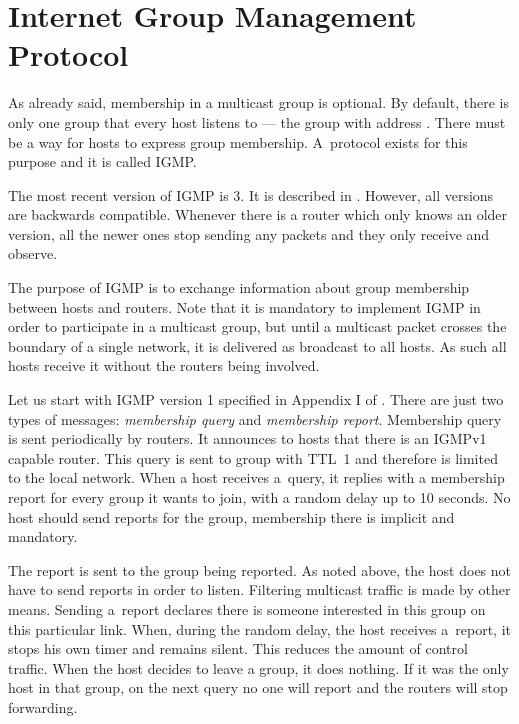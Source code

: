 \section{Internet Group Management Protocol}

As already said, membership in a multicast group is optional. By default, there
is only one group that every host listens to --- the  group with address
. There must be a way for hosts to express group membership.
A~protocol exists for this purpose and it is called IGMP.

The most recent version of IGMP is 3. It is described in . However, all
versions are backwards compatible. Whenever there is a router which only knows
an older version, all the newer ones stop sending any packets and they only receive and observe.

The purpose of IGMP is to exchange information about group membership between
hosts and routers. Note that it is mandatory to implement IGMP in order to participate in
a multicast group, but until a multicast packet crosses the boundary of a single network, it
is delivered as broadcast to all hosts. As such all hosts receive it without
the routers being involved.

Let us start with IGMP version 1 specified in Appendix I of . There
are just two types of messages: \emph{membership query} and \emph{membership report}.
Membership query is sent periodically by routers. It announces to hosts that there
is an IGMPv1 capable router. This query is sent to  group with TTL~1 and
therefore is limited to the local network. When a host receives a~query, it
replies with a membership report for every group it wants to join, with
a random delay up to 10 seconds. No host should send reports for the
 group, membership there is implicit and mandatory.

The report is sent to the group being reported. As noted above, the host does not have
to send reports in order to listen. Filtering multicast traffic is made by other means.
Sending a~report declares there is someone interested in this group on this
particular link. When, during the random delay, the host receives a~report, it
stops his own timer and remains silent. This reduces the amount of control
traffic. When the host decides to leave a group, it does nothing. If it was the
only host in that group, on the next query no one will report and the routers will
stop forwarding.

